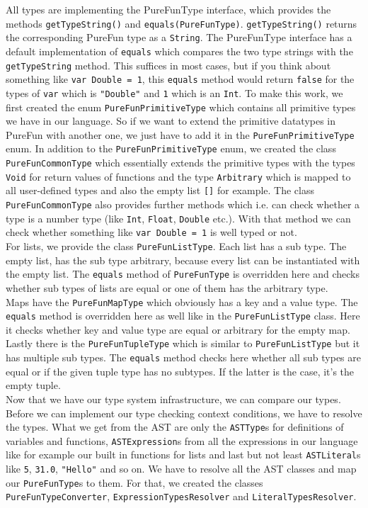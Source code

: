 All types are implementing the PureFunType interface, which provides the methods \texttt{getTypeString()} and \texttt{equals(PureFunType)}. \texttt{getTypeString()} returns the corresponding PureFun type as a \texttt{String}. The PureFunType interface has a default implementation of \texttt{equals} which compares the two type strings with the \texttt{getTypeString} method. This suffices in most cases, but if you think about something like \texttt{var Double = 1}, this \texttt{equals} method would return \texttt{false} for the types of \texttt{var} which is \texttt{"Double"} and \texttt{1} which is an \texttt{Int}. To make this work, we first created the enum \texttt{PureFunPrimitiveType} which contains all primitive types we have in our language. So if we want to extend the primitive datatypes in PureFun with another one, we just have to add it in the \texttt{PureFunPrimitiveType} enum. In addition to the \texttt{PureFunPrimitiveType} enum, we created the class \texttt{PureFunCommonType} which essentially extends the primitive types with the types \texttt{Void} for return values of functions and the type \texttt{Arbitrary} which is mapped to all user-defined types and also the empty list \texttt{[]} for example. The class \texttt{PureFunCommonType} also provides further methods which i.e. can check whether a type is a number type (like \texttt{Int}, \texttt{Float}, \texttt{Double} etc.). With that method we can check whether something like \texttt{var Double = 1} is well typed or not.\\
For lists, we provide the class \texttt{PureFunListType}. Each list has a sub type. The empty list, has the sub type arbitrary, because every list can be instantiated with the empty list. The \texttt{equals} method of \texttt{PureFunType} is overridden here and checks whether sub types of lists are equal or one of them has the arbitrary type.\\
Maps have the \texttt{PureFunMapType} which obviously has a key and a value type. The \texttt{equals} method is overridden here as well like in the \texttt{PureFunListType} class. Here it checks whether key and value type are equal or arbitrary for the empty map.\\
Lastly there is the \texttt{PureFunTupleType} which is similar to \texttt{PureFunListType} but it has multiple sub types. The \texttt{equals} method checks here whether all sub types are equal or if the given tuple type has no subtypes. If the latter is the case, it's the empty tuple.\\
Now that we have our type system infrastructure, we can compare our types. Before we can implement our type checking context conditions, we have to resolve the types. What we get from the AST are only the \texttt{ASTType}s for definitions of variables and functions, \texttt{ASTExpression}s from all the expressions in our language like for example our built in functions for lists and last but not least \texttt{ASTLiteral}s like \texttt{5}, \texttt{31.0}, \texttt{"Hello"} and so on. We have to resolve all the AST classes and map our \texttt{PureFunType}s to them. For that, we created the classes \texttt{PureFunTypeConverter}, \texttt{ExpressionTypesResolver} and \texttt{LiteralTypesResolver}.\\
